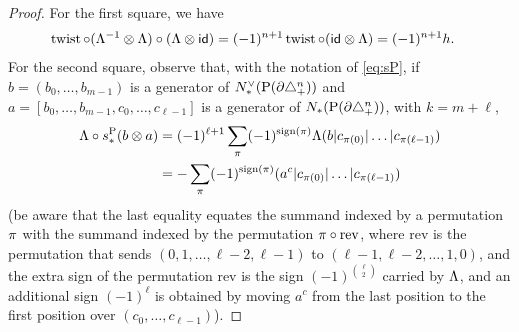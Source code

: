 \begin{proof}
	For the first square, we have
	\begin{align*}
		\operatorname{twist}\circ(\Lambda^{-1}\otimes \Lambda)\circ (\Lambda\otimes \mathsf{id})
		&= (-1)^{n+1} \operatorname{twist}\circ(\mathsf{id}\otimes \Lambda)
		= (-1)^{n+1} h.
	\end{align*}
For the second square, observe that, with the notation of \eqref{eq:sP}, if $b = (b_0,\ldots,b_{m-1})$ is a generator of $N^\vee_{*}(\operatorname{P}(\partial\triangle_{+}^n))$ and $a = [b_0,\ldots,b_{m-1},c_0,\ldots,c_{\ell-1}]$ is a generator of $N_{*}(\operatorname{P}(\partial\triangle_{+}^n))$, with $k=m+\ell$,
	\begin{equation}\label{eq:lastsign}
	\begin{split}
		\Lambda\circ s_*^{\operatorname{P}} (b\otimes a) 
		&= (-1)^{\ell+1}\sum_{\pi} (-1)^{\operatorname{sign}(\pi)} \Lambda(b|c_{\pi(0)}|\ldots|c_{\pi(\ell-1)}) 
		\\
		&= -\sum_{\pi} (-1)^{\operatorname{sign}(\pi)} (a^c|c_{\pi(0)}|\ldots|c_{\pi(\ell-1)})
	\end{split}
	\end{equation}
	(be aware that the last equality equates the summand indexed by a permutation $\pi$ with the summand indexed by the permutation $\pi\circ \mathrm{rev}$, where $\mathrm{rev}$ is the permutation that sends $(0,1,\ldots,\ell-2,\ell-1)$ to $(\ell-1,\ell-2,\ldots,1,0)$, and the extra sign of the permutation $\mathrm{rev}$ is the sign $(-1)^{\binom{\ell}{2}}$ carried by $\Lambda$, and an additional sign $(-1)^{\ell}$ is obtained by moving $a^c$ from the last position to the first position over $(c_0,\ldots,c_{\ell-1})$). 
	

\end{proof}
